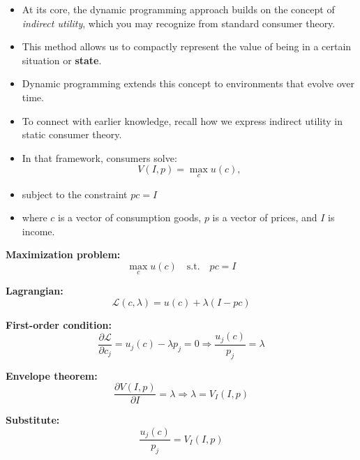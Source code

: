 \documentclass[12pt]{article}
\begin{document}
\begin{itemize}
    \item At its core, the dynamic programming approach builds on the concept of \textit{indirect utility}, which you may recognize from standard consumer theory.
    \item This method allows us to compactly represent the value of being in a certain situation or \textbf{state}.
    \item Dynamic programming extends this concept to environments that evolve over time.
    \item To connect with earlier knowledge, recall how we express indirect utility in static consumer theory.
    \item In that framework, consumers solve:
    \[
        V(I, p) = \max_{c} u(c),
    \]
    \item subject to the constraint \( pc = I \)
    \item where \( c \) is a vector of consumption goods, \( p \) is a vector of prices, and \( I \) is income.
\end{itemize}

\textbf{Maximization problem:}
\[
\max_{c} u(c) \quad \text{s.t.} \quad pc = I
\]

\textbf{Lagrangian:}
\[
\mathcal{L}(c, \lambda) = u(c) + \lambda (I - pc)
\]

\textbf{First-order condition:}
\[
\frac{\partial \mathcal{L}}{\partial c_j} = u_j(c) - \lambda p_j = 0
\Rightarrow \frac{u_j(c)}{p_j} = \lambda
\]

\textbf{Envelope theorem:}
\[
\frac{\partial V(I, p)}{\partial I} = \lambda
\Rightarrow \lambda = V_I(I, p)
\]

\textbf{Substitute:}
\[
\frac{u_j(c)}{p_j} = V_I(I, p)
\]
\end{document}
